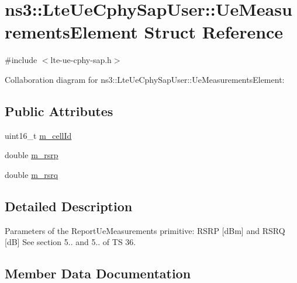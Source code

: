 \hypertarget{structns3_1_1LteUeCphySapUser_1_1UeMeasurementsElement}{}\section{ns3\+:\+:Lte\+Ue\+Cphy\+Sap\+User\+:\+:Ue\+Measurements\+Element Struct Reference}
\label{structns3_1_1LteUeCphySapUser_1_1UeMeasurementsElement}


{\ttfamily \#include $<$lte-\/ue-\/cphy-\/sap.\+h$>$}



Collaboration diagram for ns3\+:\+:Lte\+Ue\+Cphy\+Sap\+User\+:\+:Ue\+Measurements\+Element\+:
\subsection*{Public Attributes}
\begin{DoxyCompactItemize}
\item 
uint16\+\_\+t \hyperlink{structns3_1_1LteUeCphySapUser_1_1UeMeasurementsElement_a000f7f7b650c077e864a55492ea5c868}{m\+\_\+cell\+Id}
\item 
double \hyperlink{structns3_1_1LteUeCphySapUser_1_1UeMeasurementsElement_a1750d8c8076a1c90e1a18367b0d0b4f8}{m\+\_\+rsrp}
\item 
double \hyperlink{structns3_1_1LteUeCphySapUser_1_1UeMeasurementsElement_a2c5e116cfae9e38ed2795ece4f94d38c}{m\+\_\+rsrq}
\end{DoxyCompactItemize}


\subsection{Detailed Description}
Parameters of the Report\+Ue\+Measurements primitive\+: R\+S\+RP \mbox{[}d\+Bm\mbox{]} and R\+S\+RQ \mbox{[}dB\mbox{]} See section 5.. and 5.. of TS 36. 

\subsection{Member Data Documentation}
